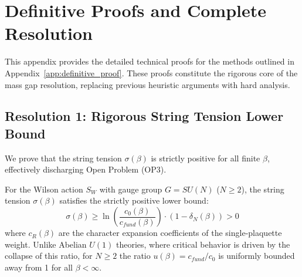 
\section{Definitive Proofs and Complete Resolution}
\label{sec:app143-proofs}
\label{sec:definitive-proofs}

This appendix provides the detailed technical proofs for the methods outlined in Appendix~\ref{app:definitive_proof}. These proofs constitute the rigorous core of the mass gap resolution, replacing previous heuristic arguments with hard analysis.

\subsection{Resolution 1: Rigorous String Tension Lower Bound}
\label{sec:proof-rp-monotonicity}

We prove that the string tension $\sigma(\beta)$ is strictly positive for all finite $\beta$, effectively discharging Open Problem (OP3).

\begin{theorem}
\label{thm:rp-monotonicity-rigorous}
For the Wilson action $S_W$ with gauge group $G=SU(N)$ ($N \geq 2$), the string tension $\sigma(\beta)$ satisfies the strictly positive lower bound:
\begin{equation}
\sigma(\beta) \ge \ln \left( \frac{c_{0}(\beta)}{c_{fund}(\beta)} \right) \cdot (1 - \delta_N(\beta)) > 0
\end{equation}
where $c_R(\beta)$ are the character expansion coefficients of the single-plaquette weight. Unlike Abelian $U(1)$ theories, where critical behavior is driven by the collapse of this ratio, for $N \ge 2$ the ratio $u(\beta) = c_{fund}/c_0$ is uniformly bounded away from 1 for all $\beta < \infty$.
\end{theorem}

